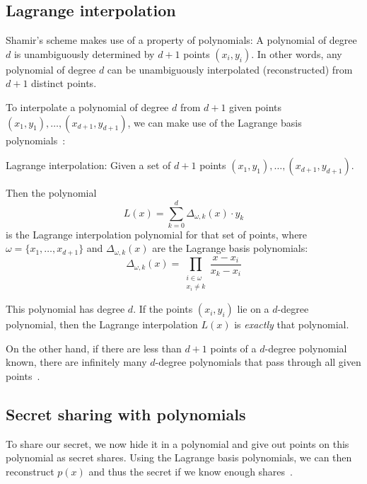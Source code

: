 \subsection{Lagrange interpolation}
Shamir's scheme makes use of a property of polynomials: A polynomial of degree $d$ is unambiguously determined by $d+1$ points $(x_i, y_i)$.
In other words, any polynomial of degree $d$ can be unambiguously interpolated (reconstructed) from $d+1$ distinct points.

To interpolate a polynomial of degree $d$ from $d+1$ given points $(x_1, y_1), \dots, (x_{d+1}, y_{d+1})$, we can make use of the Lagrange basis polynomials~\cite{yao_lightweight_2015}:

\begin{definition}
    Lagrange interpolation: Given a set of $d+1$ points $(x_1, y_1), \dots, (x_{d+1}, y_{d+1})$.

    Then the polynomial 
    \begin{equation}
        L(x) = \sum_{k=0}^d \Delta_{\omega, k}(x) \cdot y_k
    \end{equation}
    is the Lagrange interpolation polynomial for that set of points, where $\omega = \{x_1, \dots, x_{d+1}\}$ and $\Delta_{\omega,k}(x)$ are the Lagrange basis polynomials:
    \begin{equation}
        \Delta_{\omega,k}(x) = \prod_{\substack{i\in\omega\\ x_i \neq k}} \frac{x-x_i}{x_k-x_i}
    \end{equation}
\end{definition}

This polynomial has degree $d$. If the points $(x_i, y_i)$ lie on a $d$-degree polynomial, then the Lagrange interpolation $L(x)$ is \emph{exactly} that polynomial.

On the other hand, if there are less than $d+1$ points of a $d$-degree polynomial known, there are infinitely many $d$-degree polynomials that pass through all given points~\cite{shamir_how_1979}.


\subsection{Secret sharing with polynomials}
To share our secret, we now hide it in a polynomial and give out points on this polynomial as secret shares.
Using the Lagrange basis polynomials, we can then reconstruct $p(x)$ and thus the secret if we know enough shares~\cite{shamir_how_1979}.

